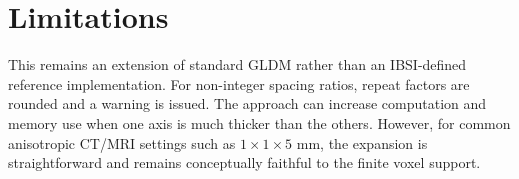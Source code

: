 \documentclass[11pt,a4paper]{article}
\begin{document}
\section*{Limitations}
This remains an extension of standard GLDM rather than an IBSI-defined reference implementation. For non-integer spacing ratios, repeat factors are rounded and a warning is issued. The approach can increase computation and memory use when one axis is much thicker than the others. However, for common anisotropic CT/MRI settings such as \(1\times1\times5\) mm, the expansion is straightforward and remains conceptually faithful to the finite voxel support.
\end{document}
